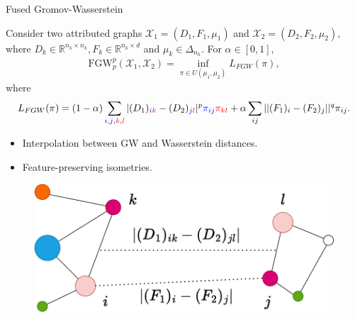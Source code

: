 \documentclass{beamer}
\newcommand{\fgw}{\text{FGW}}
\newcommand{\cX}{\mathcal X}
\newcommand{\bbR}{\mathbb R}
\begin{document}
\begin{frame}{Fused Gromov-Wasserstein}
  \tiny
  \begin{definition}
    Consider two attributed graphs $\cX_1 = (D_1, F_1, \mu_1)$ and
    $\cX_2 = (D_2, F_2, \mu_2)$,
    where $D_k \in \bbR^{n_k \times n_k}, F_k \in \bbR^{n_k \times d}$
    and $\mu_k \in \Delta_{n_k}$. For $\alpha \in [0, 1]$,
    \begin{align*}
      \fgw_p^p(\cX_1, \cX_2) = \inf_{\pi \in U(\mu_1, \mu_2)} L_{FGW}(\pi),
    \end{align*}
    \vspace{-0.3cm}
    where
    \begin{align*}
      L_{FGW}(\pi) = (1 - \alpha)
      \sum_{{\color{blue}{i}},{\color{blue}{j}},{\color{red}{k}},{\color{red}{l}}}
      |(D_1)_{{\color{blue}{i}} {\color{red}{k}}} - (D_2)_{{\color{blue}{j}}{\color{red}{l}}}|^p {\color{blue}{\pi_{ij}}} {\color{red}{\pi_{kl}}}
      + \alpha \sum_{ij} ||(F_1)_i - (F_2)_j||^q \pi_{ij}.
    \end{align*}
  \end{definition}

  \begin{minipage}[t]{0.6\linewidth}
    \begin{itemize}
      \item Interpolation between GW and Wasserstein distances.
      \item Feature-preserving isometries.
    \end{itemize}
    \end{minipage}%
    \hfill%
    \hspace{-6cm}
    \begin{minipage}[t]{0.5\linewidth}
      \vspace{-0.cm}
    \begin{figure}
      \centering
      \includegraphics[width=\linewidth, keepaspectratio=true]{OT_new/fgw.pdf}
    \end{figure}
    \end{minipage}

\end{frame}
\end{document}

